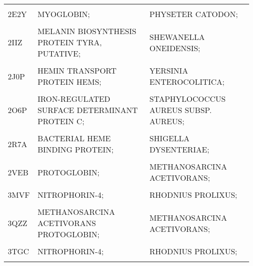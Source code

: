 \begin{table}
{\begin{tabular}{lll}
			\cellcolor{gray!6}{2CPO} & \cellcolor{gray!6}{CHLOROPEROXIDASE;} & \cellcolor{gray!6}{LEPTOXYPHIUM FUMAGO;}\\
			2E2Y & MYOGLOBIN; & PHYSETER CATODON;\\
			\addlinespace
			\cellcolor{gray!6}{2FC2} & \cellcolor{gray!6}{NITRIC OXIDE SYNTHASE;} & \cellcolor{gray!6}{BACILLUS SUBTILIS;}\\
			2IIZ & MELANIN BIOSYNTHESIS PROTEIN TYRA, PUTATIVE; & SHEWANELLA ONEIDENSIS;\\
			\cellcolor{gray!6}{2IPS} & \cellcolor{gray!6}{LACTOPEROXIDASE;} & \cellcolor{gray!6}{BOS TAURUS;}\\
			2J0P & HEMIN TRANSPORT PROTEIN HEMS; & YERSINIA ENTEROCOLITICA;\\
			\cellcolor{gray!6}{2J18} & \cellcolor{gray!6}{CHLOROPEROXIDASE;} & \cellcolor{gray!6}{CALDARIOMYCES FUMAGO;}\\
			\addlinespace
			2O6P & IRON-REGULATED SURFACE DETERMINANT PROTEIN C; & STAPHYLOCOCCUS AUREUS SUBSP. AUREUS;\\
			\cellcolor{gray!6}{2Q6N} & \cellcolor{gray!6}{CYTOCHROME P450 2B4;} & \cellcolor{gray!6}{ORYCTOLAGUS CUNICULUS;}\\
			2R7A & BACTERIAL HEME BINDING PROTEIN; & SHIGELLA DYSENTERIAE;\\
			\cellcolor{gray!6}{2SPL} & \cellcolor{gray!6}{MYOGLOBIN;} & \cellcolor{gray!6}{PHYSETER CATODON;}\\
			2VEB & PROTOGLOBIN; & METHANOSARCINA ACETIVORANS;\\
			\addlinespace
			\cellcolor{gray!6}{3HX9} & \cellcolor{gray!6}{PROTEIN RV3592;} & \cellcolor{gray!6}{MYCOBACTERIUM TUBERCULOSIS;}\\
			3MVF & NITROPHORIN-4; & RHODNIUS PROLIXUS;\\
			\cellcolor{gray!6}{3QZN} & \cellcolor{gray!6}{IRON-REGULATED SURFACE DETERMINANT PROTEIN A;} & \cellcolor{gray!6}{STAPHYLOCOCCUS AUREUS SUBSP. AUREUS;}\\
			3QZZ & METHANOSARCINA ACETIVORANS PROTOGLOBIN; & METHANOSARCINA ACETIVORANS;\\
			\cellcolor{gray!6}{3SIK} & \cellcolor{gray!6}{CONSERVED DOMAIN PROTEIN;} & \cellcolor{gray!6}{BACILLUS ANTHRACIS;}\\
			\addlinespace
			3TGC & NITROPHORIN-4; & RHODNIUS PROLIXUS;\\
			\cellcolor{gray!6}{3VP5} & \cellcolor{gray!6}{TRANSCRIPTIONAL REGULATOR;} & \cellcolor{gray!6}{LACTOCOCCUS LACTIS;}\\

\end{tabular}}
\end{table}
